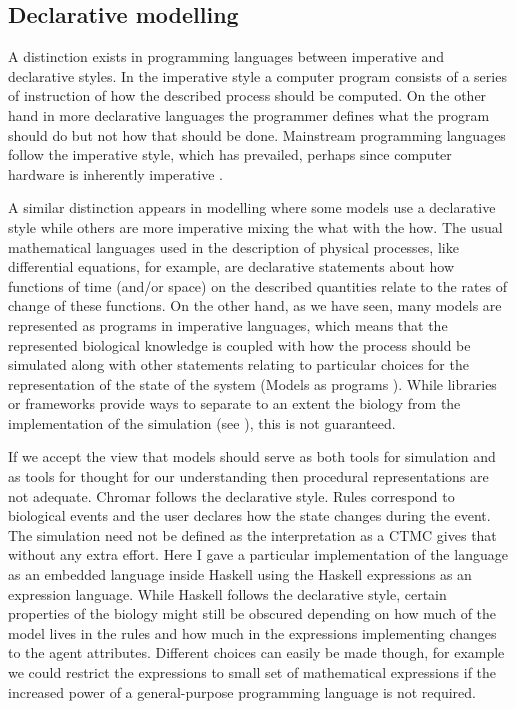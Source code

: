 \subsection{Declarative modelling}
A distinction exists in programming languages between imperative and declarative
styles. In the imperative style a computer program consists of a series of
instruction of how the described process should be computed. On the other hand
in more declarative languages the programmer defines what the program should do
but not how that should be done. Mainstream programming languages follow the
imperative style, which has prevailed, perhaps since computer hardware is
inherently imperative \citep{backus2007can}.

A similar distinction appears in modelling where some models use a declarative
style while others are more imperative mixing the what with the how. The usual
mathematical languages used in the description of physical processes, like
differential equations, for example, are declarative statements about how
functions of time (and/or space) on the described quantities relate to the rates
of change of these functions. On the other hand, as we have seen, many models
are represented as programs in imperative languages, which means that the
represented biological knowledge is coupled with how the process should be
simulated along with other statements relating to particular choices for the
representation of the state of the system (Models as programs
). While libraries or frameworks provide ways to
separate to an extent the biology from the implementation of the simulation (see
), this is not guaranteed.

If we accept the view that models should serve as both tools for simulation and
as tools for thought for our understanding then procedural representations
are not adequate. Chromar follows the declarative style. Rules correspond to
biological events and the user declares how the state changes during the
event. The simulation need not be defined as the interpretation as a CTMC gives
that without any extra effort. Here I gave a particular implementation of the
language as an embedded language inside Haskell using the Haskell expressions as
an expression language. While Haskell follows the declarative style, certain
properties of the biology might still be obscured depending on how much of the
model lives in the rules and how much in the expressions implementing changes to
the agent attributes. Different choices can easily be made though, for example
we could restrict the expressions to small set of mathematical expressions
\citep[perhaps a subset of MathML][]{ausbrooks2003mathematical} if the increased
power of a general-purpose programming language is not required.

